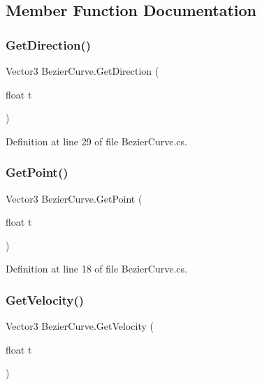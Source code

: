 \subsection{Member Function Documentation}
\mbox{\label{class_bezier_curve_aee84a49317214403c6f59c2a60903662}} 
\subsubsection{\texorpdfstring{Get\+Direction()}{GetDirection()}}
{\footnotesize\ttfamily Vector3 Bezier\+Curve.\+Get\+Direction (\begin{DoxyParamCaption}\item[{float}]{t }\end{DoxyParamCaption})}



Definition at line 29 of file Bezier\+Curve.\+cs.

\mbox{\label{class_bezier_curve_a0ac697a04b35213e11d9c93a183ee7fe}} 
\subsubsection{\texorpdfstring{Get\+Point()}{GetPoint()}}
{\footnotesize\ttfamily Vector3 Bezier\+Curve.\+Get\+Point (\begin{DoxyParamCaption}\item[{float}]{t }\end{DoxyParamCaption})}



Definition at line 18 of file Bezier\+Curve.\+cs.

\mbox{\label{class_bezier_curve_a3b39e1db5e230d6c4a89ec0386779efa}} 
\subsubsection{\texorpdfstring{Get\+Velocity()}{GetVelocity()}}
{\footnotesize\ttfamily Vector3 Bezier\+Curve.\+Get\+Velocity (\begin{DoxyParamCaption}\item[{float}]{t }\end{DoxyParamCaption})}



